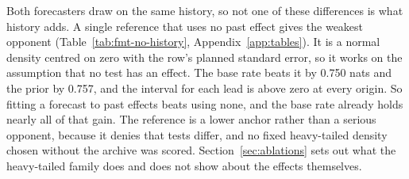 Both forecasters draw on the same history, so not one of these differences is what history adds. A single reference that uses no past effect gives the weakest opponent (Table~\ref{tab:fmt-no-history}, Appendix~\ref{app:tables}). It is a normal density centred on zero with the row's planned standard error, so it works on the assumption that no test has an effect. The base rate beats it by 0.750 nats and the prior by 0.757, and the interval for each lead is above zero at every origin. So fitting a forecast to past effects beats using none, and the base rate already holds nearly all of that gain. The reference is a lower anchor rather than a serious opponent, because it denies that tests differ, and no fixed heavy-tailed density chosen without the archive was scored. Section~\ref{sec:ablations} sets out what the heavy-tailed family does and does not show about the effects themselves.

